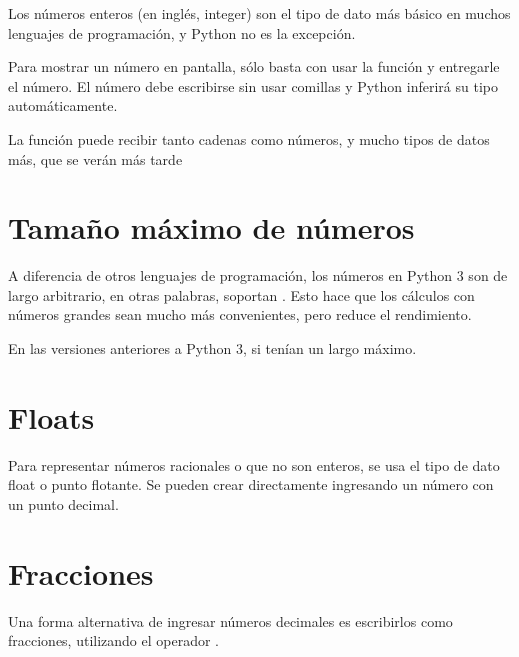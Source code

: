 Los números enteros (en inglés, integer) son el tipo de dato más básico en muchos lenguajes de programación, y Python no es la excepción.


Para mostrar un número en pantalla, sólo basta con usar la función  y entregarle el número.
El número debe escribirse sin usar comillas y Python inferirá su tipo automáticamente.


La función  puede recibir tanto cadenas como números, y mucho tipos de datos más, que se verán más tarde

\section{Tamaño máximo de números}

A diferencia de otros lenguajes de programación, los números en Python 3 son de largo arbitrario, en otras palabras, soportan .
Esto hace que los cálculos con números grandes sean mucho más convenientes, pero reduce el rendimiento.


En las versiones anteriores a Python 3, si tenían un largo máximo.

\section{Floats}
    
Para representar números racionales o que no son enteros, se usa el tipo de dato float o punto flotante.
Se pueden crear directamente ingresando un número con un punto decimal.


\section{Fracciones}

Una forma alternativa de ingresar números decimales es escribirlos como fracciones, utilizando el operador \ttt{/}.

